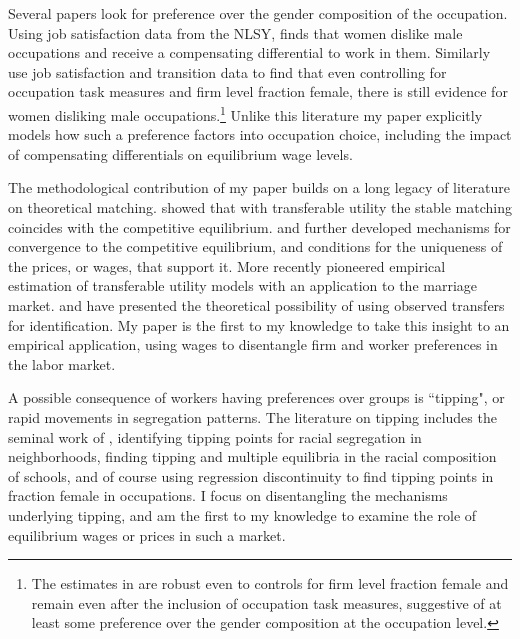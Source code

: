 \documentclass[11pt]{article}
\begin{document}
Several papers look for preference over the gender composition of the occupation. Using job satisfaction data from the NLSY,  finds that women dislike male occupations and receive a compensating differential to work in them. Similarly  use job satisfaction and transition data to find that even controlling for occupation task measures and firm level fraction female, there is still evidence for women disliking male occupations.\footnote{The estimates in  are robust even to controls for firm level fraction female and remain even after the inclusion of occupation task measures, suggestive of at least some preference over the gender composition at the occupation level.} Unlike this literature my paper explicitly models how such a preference factors into occupation choice, including the impact of compensating differentials on equilibrium wage levels.

The methodological contribution of my paper builds on a long legacy of literature on theoretical matching.  showed that with transferable utility the stable matching coincides with the competitive equilibrium.  and  further developed mechanisms for convergence to the competitive equilibrium, and conditions for the uniqueness of the prices, or wages, that support it. More recently  pioneered empirical estimation of transferable utility models with an application to the marriage market.  and  have presented the theoretical possibility of using observed transfers for identification. My paper is the first to my knowledge to take this insight to an empirical application, using wages to disentangle firm and worker preferences in the labor market.

A possible consequence of workers having preferences over groups is ``tipping", or rapid movements in segregation patterns. The literature on tipping includes the seminal work of , identifying tipping points for racial segregation in neighborhoods,  finding tipping and multiple equilibria in the racial composition of schools, and of course  using regression discontinuity to find tipping points in fraction female in occupations. I focus on disentangling the mechanisms underlying tipping, and am the first to my knowledge to examine the role of equilibrium wages or prices in such a market.
\end{document}
